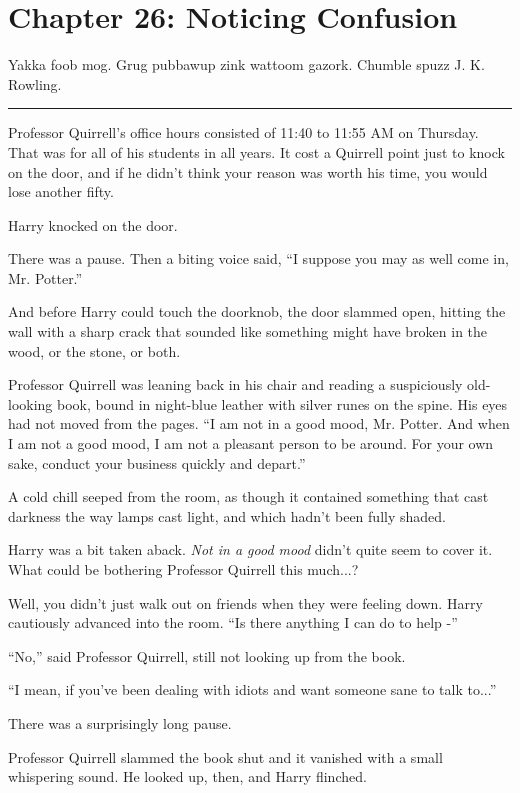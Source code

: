 \chapter{Chapter 26: Noticing Confusion}
Yakka foob mog. Grug pubbawup zink wattoom gazork. Chumble spuzz J. K.
Rowling.

\begin{center}\rule{3in}{0.4pt}\end{center}

Professor Quirrell's office hours consisted of 11:40 to 11:55 AM on
Thursday. That was for all of his students in all years. It cost a
Quirrell point just to knock on the door, and if he didn't think your
reason was worth his time, you would lose another fifty.

Harry knocked on the door.

There was a pause. Then a biting voice said, ``I suppose you may as well
come in, Mr. Potter.''

And before Harry could touch the doorknob, the door slammed open,
hitting the wall with a sharp crack that sounded like something might
have broken in the wood, or the stone, or both.

Professor Quirrell was leaning back in his chair and reading a
suspiciously old-looking book, bound in night-blue leather with silver
runes on the spine. His eyes had not moved from the pages. ``I am not in
a good mood, Mr. Potter. And when I am not a good mood, I am not a
pleasant person to be around. For your own sake, conduct your business
quickly and depart.''

A cold chill seeped from the room, as though it contained something that
cast darkness the way lamps cast light, and which hadn't been fully
shaded.

Harry was a bit taken aback. \emph{Not in a good mood} didn't quite seem
to cover it. What could be bothering Professor Quirrell this
much...?

Well, you didn't just walk out on friends when they were feeling down.
Harry cautiously advanced into the room. ``Is there anything I can do to
help -''

``No,'' said Professor Quirrell, still not looking up from the book.

``I mean, if you've been dealing with idiots and want someone sane to
talk to...''

There was a surprisingly long pause.

Professor Quirrell slammed the book shut and it vanished with a small
whispering sound. He looked up, then, and Harry flinched.


